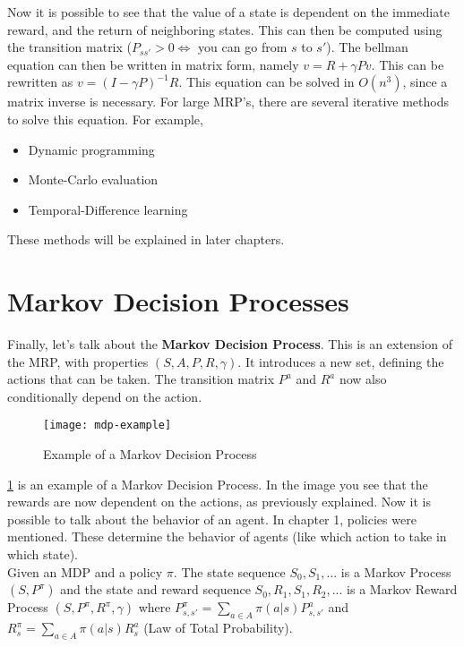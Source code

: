 Now it is possible to see that the value of a state is dependent on the immediate reward, and the return of neighboring states. This can then be computed using the transition matrix ($P_{ss'} > 0 \iff$ you can go from $s$ to $s'$). The bellman equation can then be written in matrix form, namely $v = R + \gamma Pv$.
This can be rewritten as $v = (I - \gamma P)^{-1} R$. This equation can be solved in $O(n^3)$, since a matrix inverse is necessary. For large MRP's, there are several iterative methods to solve this equation. For example,

\begin{itemize}
	\item Dynamic programming
	\item Monte-Carlo evaluation
	\item Temporal-Difference learning
\end{itemize}

These methods will be explained in later chapters.\\

\pagebreak

\section{Markov Decision Processes}

Finally, let's talk about the \textbf{Markov Decision Process}. This is an extension of the MRP, with properties $(S, A, P, R, \gamma)$. It introduces a new set, defining the actions that can be taken. The transition matrix $P^a$ and $R^a$ now also conditionally depend on the action.

\begin{figure}[h]
	\centering
	\texttt{[image: mdp-example]}
	\caption{Example of a Markov Decision Process}
	\label{ex:mdp}
\end{figure}

\ref{ex:mdp} is an example of a Markov Decision Process. In the image you see that the rewards are now dependent on the actions, as previously explained. Now it is possible to talk about the behavior of an agent. In chapter 1, policies were mentioned. These determine the behavior of agents (like which action to take in which state).\\

Given an MDP and a policy $\pi$. The state sequence $S_0, S_1, ...$ is a Markov Process $(S, P^\pi)$ and the state and reward sequence $S_0, R_1, S_1, R_2, ...$ is a Markov Reward Process $(S, P^\pi, R^\pi, \gamma)$ where $P^\pi_{s, s'} = \sum_{a \in A} \pi(a | s)P^a_{s, s'}$ and $R^\pi_s = \sum_{a \in A} \pi(a | s)R^a_s$ (Law of Total Probability).\\

